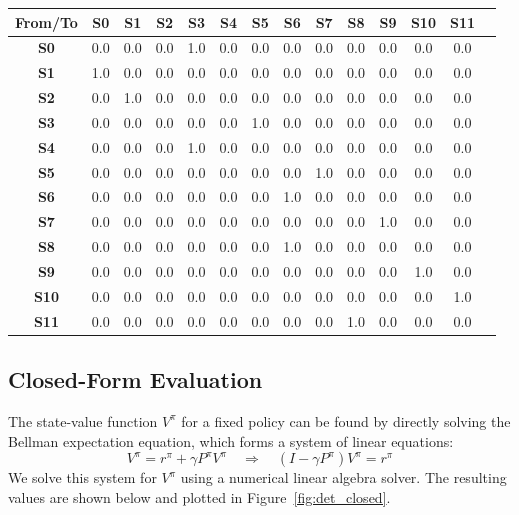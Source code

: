 \documentclass[12pt]{article}
\begin{document}
\begin{center}
\begin{tabular}{|c|c|c|c|c|c|c|c|c|c|c|c|c|c|}
\hline
\textbf{From/To} & \textbf{S0} & \textbf{S1} & \textbf{S2} & \textbf{S3} & \textbf{S4} & \textbf{S5} & \textbf{S6} & \textbf{S7} & \textbf{S8} & \textbf{S9} & \textbf{S10} & \textbf{S11} \\
\hline
\textbf{S0} & 0.0 & 0.0 & 0.0 & 1.0 & 0.0 & 0.0 & 0.0 & 0.0 & 0.0 & 0.0 & 0.0 & 0.0 \\
\hline
\textbf{S1} & 1.0 & 0.0 & 0.0 & 0.0 & 0.0 & 0.0 & 0.0 & 0.0 & 0.0 & 0.0 & 0.0 & 0.0 \\
\hline
\textbf{S2} & 0.0 & 1.0 & 0.0 & 0.0 & 0.0 & 0.0 & 0.0 & 0.0 & 0.0 & 0.0 & 0.0 & 0.0 \\
\hline
\textbf{S3} & 0.0 & 0.0 & 0.0 & 0.0 & 0.0 & 1.0 & 0.0 & 0.0 & 0.0 & 0.0 & 0.0 & 0.0 \\
\hline
\textbf{S4} & 0.0 & 0.0 & 0.0 & 1.0 & 0.0 & 0.0 & 0.0 & 0.0 & 0.0 & 0.0 & 0.0 & 0.0 \\
\hline
\textbf{S5} & 0.0 & 0.0 & 0.0 & 0.0 & 0.0 & 0.0 & 0.0 & 1.0 & 0.0 & 0.0 & 0.0 & 0.0 \\
\hline
\textbf{S6} & 0.0 & 0.0 & 0.0 & 0.0 & 0.0 & 0.0 & 1.0 & 0.0 & 0.0 & 0.0 & 0.0 & 0.0 \\
\hline
\textbf{S7} & 0.0 & 0.0 & 0.0 & 0.0 & 0.0 & 0.0 & 0.0 & 0.0 & 0.0 & 1.0 & 0.0 & 0.0 \\
\hline
\textbf{S8} & 0.0 & 0.0 & 0.0 & 0.0 & 0.0 & 0.0 & 1.0 & 0.0 & 0.0 & 0.0 & 0.0 & 0.0 \\
\hline
\textbf{S9} & 0.0 & 0.0 & 0.0 & 0.0 & 0.0 & 0.0 & 0.0 & 0.0 & 0.0 & 0.0 & 1.0 & 0.0 \\
\hline
\textbf{S10} & 0.0 & 0.0 & 0.0 & 0.0 & 0.0 & 0.0 & 0.0 & 0.0 & 0.0 & 0.0 & 0.0 & 1.0 \\
\hline
\textbf{S11} & 0.0 & 0.0 & 0.0 & 0.0 & 0.0 & 0.0 & 0.0 & 0.0 & 1.0 & 0.0 & 0.0 & 0.0 \\
\hline
\end{tabular}
\end{center}

\subsection{Closed-Form Evaluation}
The state-value function $V^\pi$ for a fixed policy can be found by directly solving the Bellman expectation equation, which forms a system of linear equations:
\[ V^\pi = r^\pi + \gamma P^\pi V^\pi \quad \Rightarrow \quad (I - \gamma P^\pi)V^\pi = r^\pi \]
We solve this system for $V^\pi$ using a numerical linear algebra solver. The resulting values are shown below and plotted in Figure~\ref{fig:det_closed}.
\end{document}
